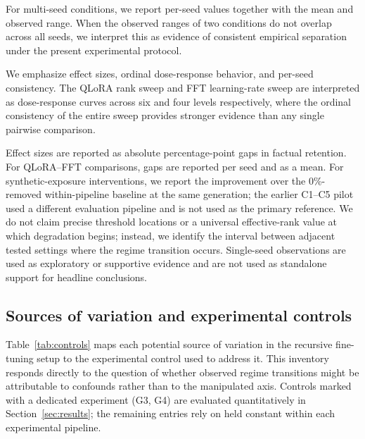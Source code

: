 \documentclass[a4paper,fleqn]{cas-dc}
\newif\ifshowchanges
\newcommand{\rev}[1]{\ifshowchanges{\color{blue}#1}\else{#1}\fi}
\begin{document}
For multi-seed conditions, we report per-seed values together with the mean and
observed range. When the observed ranges of two conditions do not overlap across
all seeds, we interpret this as evidence of consistent empirical separation
under the present experimental protocol.

We emphasize
effect sizes, ordinal dose-response behavior, and per-seed consistency. The
QLoRA rank sweep and FFT learning-rate sweep are interpreted as dose-response
curves across six and four levels respectively, where the ordinal consistency of
the entire sweep provides stronger evidence than any single pairwise comparison.

Effect sizes are reported as absolute percentage-point gaps in factual retention.
For QLoRA--FFT comparisons, gaps are reported per seed and as a mean. For
synthetic-exposure interventions, we report the improvement over the \rev{0\%-removed
within-pipeline baseline} at the same generation; \rev{the earlier C1--C5 pilot used a
different evaluation pipeline and is not used as the primary reference.} We do not claim precise threshold locations
or a universal effective-rank value at which degradation begins; instead, we
identify the interval between adjacent tested settings where the regime
transition occurs. Single-seed observations are used as exploratory or
supportive evidence and are not used as standalone support for headline
conclusions.

\subsection{Sources of variation and experimental controls}\label{sec:controls}

Table~\ref{tab:controls} maps each potential source of variation in the
recursive fine-tuning setup to the experimental control used to address it.
This inventory responds directly to the question of whether observed regime
transitions might be attributable to confounds rather than to the manipulated
axis. Controls marked with a dedicated experiment (G3, G4) are evaluated
quantitatively in Section~\ref{sec:results}; the remaining entries rely on
\rev{held constant within each experimental pipeline}.
\end{document}
